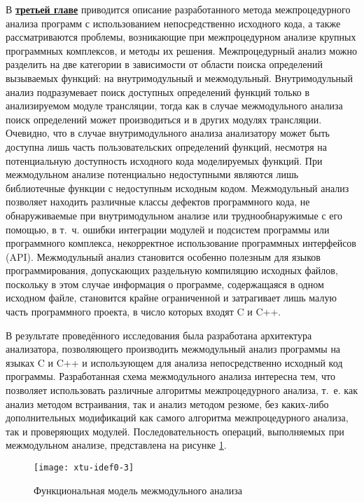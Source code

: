 В \underline{\textbf{третьей главе}} приводится описание разработанного метода межпроцедурного анализа программ с использованием непосредственно исходного кода, а также рассматриваются проблемы, возникающие при межпроцедурном анализе крупных программных комплексов, и методы их решения. Межпроцедурный анализ можно разделить на две категории в зависимости от области поиска определений вызываемых функций: на внутримодульный и межмодульный. Внутримодульный анализ подразумевает поиск доступных определений функций только в анализируемом модуле трансляции, тогда как в случае межмодульного анализа поиск определений может производиться и в других модулях трансляции. Очевидно, что в случае внутримодульного анализа анализатору может быть доступна лишь часть пользовательских определений функций, несмотря на потенциальную доступность исходного  кода моделируемых функций. При межмодульном анализе потенциально недоступными являются лишь библиотечные функции с недоступным исходным кодом. Межмодульный анализ позволяет находить различные классы дефектов программного кода, не обнаруживаемые при внутримодульном анализе или труднообнаружимые с его помощью, в т.~ч. ошибки интеграции модулей и подсистем программы или программного комплекса, некорректное использование программных интерфейсов (API). Межмодульный анализ становится особенно полезным для языков программирования, допускающих раздельную компиляцию исходных файлов, поскольку в этом случае информация о программе, содержащаяся в одном исходном файле, становится крайне ограниченной и затрагивает лишь малую часть программного проекта, в число которых входят C и C++.

В результате проведённого исследования была разработана архитектура анализатора, позволяющего производить межмодульный анализ программы на языках C и C++ и использующем для анализа непосредственно исходный код программы. Разработанная схема межмодульного анализа интересна тем, что позволяет использовать различные алгоритмы межпроцедурного анализа, т.~е. как анализ методом встраивания, так и анализ методом резюме, без каких-либо дополнительных модификаций как самого алгоритма межпроцедурного анализа, так и проверяющих модулей. Последовательность операций, выполняемых при межмодульном анализе, представлена на рисунке \ref{xtu-idef0}.

\begin{figure}[h]
 \label{}
 \centering
 \texttt{[image: xtu-idef0-3]}
 \caption{Функциональная модель межмодульного анализа}\label{xtu-idef0}
\end{figure}


